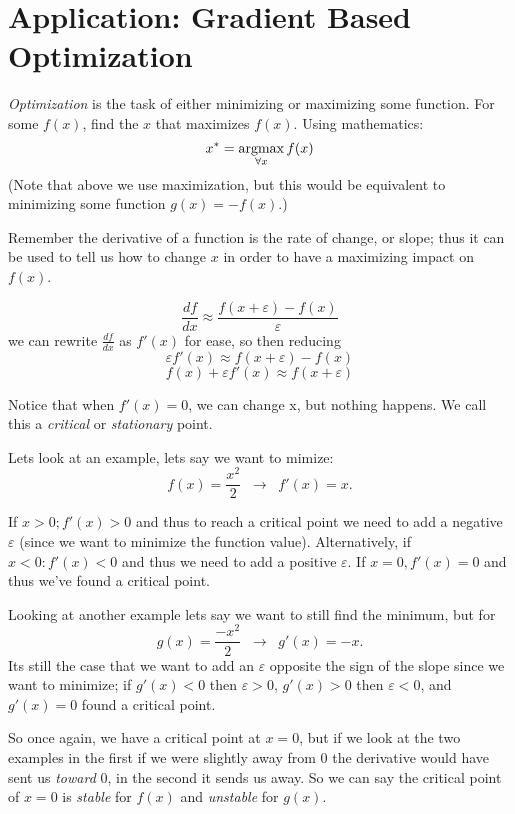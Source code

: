 
\section{Application: Gradient Based Optimization}
\emph{Optimization} is the task of either minimizing or maximizing some function. 
For some $f(x)$, find the $x$ that maximizes $f(x)$. 
Using mathematics: 
\[ x^* = \operatorname*{argmax}_{\forall x} f(x) \]
(Note that above we use maximization, but this would be equivalent to minimizing some function $g(x)=-f(x)$.)

Remember the derivative of a function is the rate of change, or slope; 
thus it can be used to tell us how to change $x$ in order to have a maximizing impact on $f(x)$. 

\[\frac{df}{dx} \approx \frac{f(x+\varepsilon)-f(x)}{\varepsilon}\]
we can rewrite $\frac{df}{dx}$ as $f'(x)$ for ease, so then reducing
\[\varepsilon f'(x) \approx f(x+\varepsilon)-f(x)\]
\[f(x) + \varepsilon f'(x) \approx f(x+\varepsilon)\]

Notice that when $f'(x)=0$, we can change x, but nothing happens. 
We call this a \emph{critical} or \emph{stationary} point. 

Lets look at an example, lets say we want to mimize: 
\[f(x) = \frac{x^2}{2}  \;\;\rightarrow\;\; f'(x) = x.\]

If $x>0; f'(x)>0$ and thus to reach a critical point we need to add a negative $\varepsilon$ 
(since we want to minimize the function value). 
Alternatively, if $x<0: f'(x)<0$ and thus we need to add a positive $\varepsilon$. 
If $x=0, f'(x)=0$ and thus we've found a critical point. 

Looking at another example lets say we want to still find the minimum, but for 
\[g(x) = \frac{-x^2}{2}  \;\;\rightarrow\;\; g'(x) = -x.\]
Its still the case that we want to add an $\varepsilon$ opposite the sign of the slope since we want to minimize; 
if $g'(x)<0$ then $\varepsilon>0$, $g'(x)>0$ then $\varepsilon<0$, and $g'(x)=0$ found a critical point. 

So once again, we have a critical point at $x=0$, 
but if we look at the two examples in the first if we were slightly away from 0 the derivative would have sent us \textit{toward} 0, in the second it sends us away. 
So we can say the critical point of $x=0$ is \emph{stable} for $f(x)$ and \emph{unstable} for $g(x)$. 


